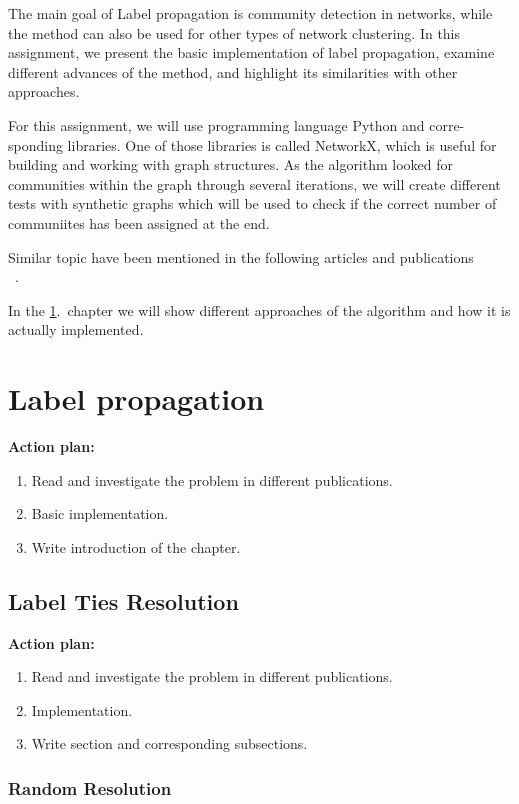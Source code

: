 \documentclass[a4paper, 12pt]{book}
\begin{document}
The main goal of Label propagation is community detection in networks, while the method can also be used for other types of network clustering. In this assignment, we present the basic implementation of label propagation, examine different advances of the method, and highlight its similarities with other approaches.

For this assignment, we will use programming language Python and corre- sponding libraries. One of those libraries is called NetworkX, which is useful for building and working with graph structures. As the algorithm looked for communities within the graph through several iterations, we will create different tests with synthetic graphs which will be used to check if the correct number of communiites has been assigned at the end.

Similar topic have been mentioned in the following articles and publications~\cite{article1} ~\cite{article2} ~\cite{article3} ~\cite{article4}.

In the \ref{ch0}.~chapter we will show different approaches of the algorithm and how it is actually implemented.


\chapter{Label propagation}
\label{ch0}

\textbf{Action plan:}
   \begin{enumerate}
     \item Read and investigate the problem in different publications.
     \item Basic implementation.
     \item Write introduction of the chapter.
   \end{enumerate}

\section{Label Ties Resolution}
\textbf{Action plan:}
   \begin{enumerate}
     \item Read and investigate the problem in different publications.
     \item Implementation.
     \item Write section and corresponding subsections.
   \end{enumerate}
\subsection{Random Resolution}
\end{document}
